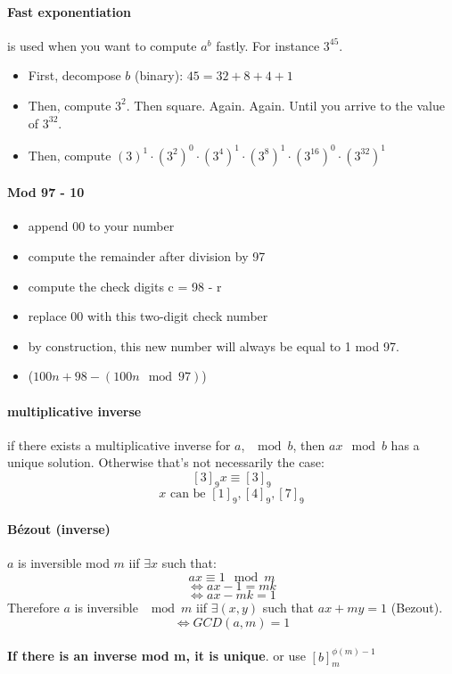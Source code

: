 \documentclass{article}
\begin{document}
\paragraph{Fast exponentiation} is used when you want to compute $ a^b $ fastly. For instance $ 3^45 $.
\begin{itemize}
    \item First, decompose $ b $ (binary): $45 = 32 + 8 + 4 + 1$
    \item Then, compute $ 3^2 $. Then square. Again. Again. Until you arrive to the value of $ 3^{32} $.
    \item Then, compute $ (3)^1 \cdot (3^2)^0 \cdot (3^4)^1 \cdot (3^8)^1 \cdot (3^{16})^0 \cdot (3^{32})^1 $
\end{itemize}

\paragraph{Mod 97 - 10}

\begin{itemize}
    \item append 00 to your number
    \item compute the remainder after division by 97
    \item compute the check digits c = 98 - r
    \item replace 00 with this two-digit check number
    \item by construction, this new number will always be equal to 1 mod 97.
    \item ($100n + 98 - (100n \mod 97)$)
\end{itemize}

\paragraph{multiplicative inverse} if there exists a multiplicative inverse for $ a $, $ \mod b $, then $ ax \mod b $ has a unique solution. Otherwise that's not necessarily the case:
\[ [3]_9x \equiv [3]_9 \]
\[ x \text { can be } [1]_9, [4]_9, [7]_9 \]

\paragraph{Bézout (inverse)} $ a $ is inversible mod $ m $ iif $ \exists x $ such that:
\[ ax \equiv 1 \mod m \]
\[ \Leftrightarrow ax - 1 = mk \]
\[ \Leftrightarrow ax - mk = 1 \]
Therefore $ a $ is inversible $ \mod m $ iif $ \exists (x, y) $ such that $ ax + my = 1 $ (Bezout).\\
\[ \Leftrightarrow GCD(a, m) = 1 \]\\
\textbf{If there is an inverse mod m, it is unique}.
or use $ [b]_m^{\phi(m) -1} $
\end{document}
